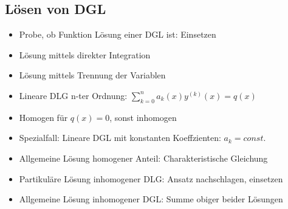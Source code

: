 \documentclass[a4paper,10pt]{article}
\begin{document}
\begin{multicols}{2}
\section {Lösen von DGL}
\begin{itemize}
\item Probe, ob Funktion Lösung einer DGL ist: Einsetzen
\item Lösung mittels direkter Integration
\item Lösung mittels Trennung der Variablen
\item Lineare DLG n-ter Ordnung: $\sum_{k=0}^n a_k(x) y^{(k)}(x) = q(x)$
\item Homogen für $q(x) = 0$, sonst inhomogen
\item Spezialfall: Lineare DGL mit konstanten Koeffzienten: $a_k = const.$
\item Allgemeine Lösung homogener Anteil: Charakteristische Gleichung
\item Partikuläre Lösung inhomogener DLG: Ansatz nachschlagen, einsetzen
\item Allgemeine Lösung inhomogener DGL: Summe obiger beider Lösungen
\end{itemize}

\end{multicols}
\end{document}
